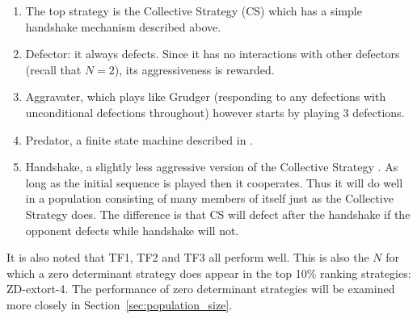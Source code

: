 \documentclass{article}
\begin{document}
\begin{enumerate}
    \item The top strategy is the Collective Strategy (CS) which has a simple
        handshake mechanism described above.
    \item Defector: it always defects. Since it has no interactions with other
        defectors (recall that \(N=2\)), its aggressiveness is rewarded.
    \item Aggravater, which plays like Grudger (responding to any
        defections with unconditional defections throughout) however starts by
        playing 3 defections.
    \item Predator, a finite state machine described in \cite{Ashlock2006}.
    \item Handshake, a slightly less aggressive version of the Collective
        Strategy \cite{robson1989}. As long as the initial sequence is played
        then it cooperates. Thus it will do well in a population consisting of
        many members of itself just as the Collective Strategy does. The
        difference is that CS will defect after the handshake if the opponent
        defects while handshake will not.
\end{enumerate}

It is also noted that TF1, TF2 and TF3 all perform well. This is also the \(N\)
for which a zero determinant strategy does appear in the top 10\% ranking
strategies: ZD-extort-4. The performance of zero determinant strategies will be
examined more closely in Section~\ref{sec:population_size}.
\end{document}
